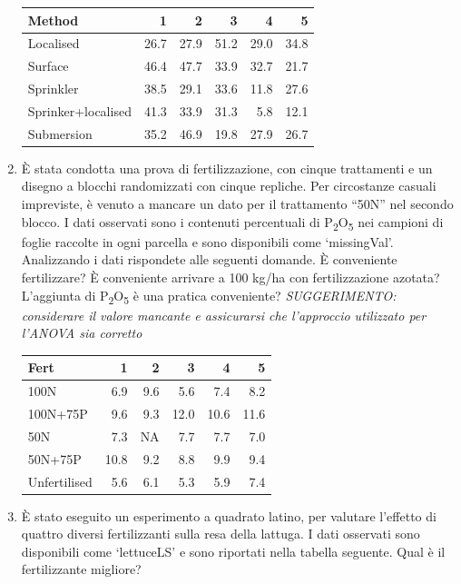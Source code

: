 \documentclass[
  12pt,
]{book}
\begin{document}
\begin{enumerate}
  \begin{longtable}[]{@{}lrrrrr@{}}
  \toprule()
  Method & 1 & 2 & 3 & 4 & 5 \\
  \midrule()
  \endhead
  Localised & 26.7 & 27.9 & 51.2 & 29.0 & 34.8 \\
  Surface & 46.4 & 47.7 & 33.9 & 32.7 & 21.7 \\
  Sprinkler & 38.5 & 29.1 & 33.6 & 11.8 & 27.6 \\
  Sprinker+localised & 41.3 & 33.9 & 31.3 & 5.8 & 12.1 \\
  Submersion & 35.2 & 46.9 & 19.8 & 27.9 & 26.7 \\
  \bottomrule()
  \end{longtable}
\item
  È stata condotta una prova di fertilizzazione, con cinque trattamenti e un disegno a blocchi randomizzati con cinque repliche. Per circostanze casuali impreviste, è venuto a mancare un dato per il trattamento ``50N'' nel secondo blocco. I dati osservati sono i contenuti percentuali di P\textsubscript{2}O\textsubscript{5} nei campioni di foglie raccolte in ogni parcella e sono disponibili come `missingVal'. Analizzando i dati rispondete alle seguenti domande. È conveniente fertilizzare? È conveniente arrivare a 100 kg/ha con fertilizzazione azotata? L'aggiunta di P\textsubscript{2}O\textsubscript{5} è una pratica conveniente? \emph{SUGGERIMENTO: considerare il valore mancante e assicurarsi che l'approccio utilizzato per l'ANOVA sia corretto}

  \begin{longtable}[]{@{}lrrrrr@{}}
  \toprule()
  Fert & 1 & 2 & 3 & 4 & 5 \\
  \midrule()
  \endhead
  100N & 6.9 & 9.6 & 5.6 & 7.4 & 8.2 \\
  100N+75P & 9.6 & 9.3 & 12.0 & 10.6 & 11.6 \\
  50N & 7.3 & NA & 7.7 & 7.7 & 7.0 \\
  50N+75P & 10.8 & 9.2 & 8.8 & 9.9 & 9.4 \\
  Unfertilised & 5.6 & 6.1 & 5.3 & 5.9 & 7.4 \\
  \bottomrule()
  \end{longtable}
\item
  È stato eseguito un esperimento a quadrato latino, per valutare l'effetto di quattro diversi fertilizzanti sulla resa della lattuga. I dati osservati sono disponibili come `lettuceLS' e sono riportati nella tabella seguente. Qual è il fertilizzante migliore?


\end{enumerate}
\end{document}
